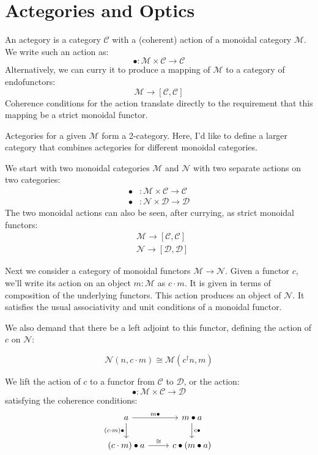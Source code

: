 \documentclass[11pt]{amsart}
\newcommand{\cat}[1]{\mathcal{#1}}%
\begin{document}
\section{Actegories and Optics}

An actegory is a category $\cat C$ with a (coherent) action of a monoidal category $\cat M$. We write such an action as:
\[ \bullet \colon \cat M \times \cat C \to \cat C \]
Alternatively, we can curry it to produce a mapping of $\cat M$ to a category of endofunctors:
\[ \cat M \to [\cat C, \cat C] \]
Coherence conditions for the action translate directly to the requirement that this mapping be a strict monoidal functor. 




Actegories for a given $\cat M$ form a 2-category. Here, I'd like to define a larger category that combines actegories for different monoidal categories.

We start with two monoidal categories $\cat M$ and $\cat N$ with two separate actions on two categories:
\begin{align*} 
\bullet &\colon \cat M \times \cat C \to \cat C 
\\
 \bullet &\colon \cat N \times \cat D \to \cat D 
\end{align*}
The two monoidal actions can also be seen, after currying, as strict monoidal functors:
\begin{align*}
&\cat M \to [\cat C, \cat C]
\\
&\cat N \to [\cat D, \cat D]
\end{align*}

Next we consider a category of monoidal functors $\cat M \to \cat N$. Given a functor $c$, we'll write its action on an object $m \colon \cat M$ as $c \cdot m$. It is given in terms of composition of the underlying functors. This action produces an object of $\cat N$. It satisfies the usual associativity and unit conditions of a monoidal functor. 

We also demand that there be a left adjoint to this functor, defining the action of $c$ on $\cat N$:

\[ \cat N (n, c \cdot m) \cong \cat M (c^{\dagger} n, m) \]

We lift the action of $c$ to a functor from $\cat C$ to  $\cat D$, or the action:
\[ \bullet \colon \cat M \times \cat C \to \cat D \]
satisfying the coherence conditions:
\[
 \begin{tikzcd}
 a
 \arrow [r, "m \bullet"] 
 \arrow [d, "(c \cdot m) \bullet"']
 & m \bullet a
 \arrow [d, "c \bullet"]
 \\
 (c \cdot m) \bullet a
 \arrow [r, "\cong"]
 & c \bullet (m \bullet a)
 \end{tikzcd}
\]
\end{document}
